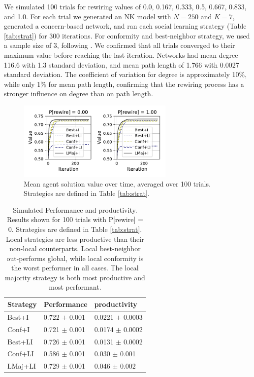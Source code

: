 We simulated 100 trials for rewiring values of 0.0, 0.167, 0.333, 0.5, 0.667, 0.833, and 1.0.
For each trial we generated an NK model with $N=250$ and $K=7$,
generated a concern-based network, and ran each social learning strategy
(Table \ref{tab:strat}) for 300 iterations.
For conformity and best-neighbor strategy, we used a sample size of 3, following
\cite{barkoczi_social_2016}.
We confirmed that all trials converged to their maximum value before reaching
the last iteration.
Networks had mean degree 116.6 with 1.3 standard deviation,
and mean path length of 1.766 with 0.0027 standard deviation.
The coefficient of variation for degree is approximately 10\%,
while only 1\% for mean path length, confirming that the rewiring process has a stronger influence
on degree than on path length.

\begin{figure}[t!]
\centering
\includegraphics[width=3in,height=1.5in]{fig/WPProdPerf/fig-val-iter.pdf}
\caption{
Mean agent solution value over time, averaged over 100 trials.
Strategies are defined in Table \ref{tab:strat}.
\label{fig:val-iter}
}
\end{figure}

\begin{table}
\small
\centering
\begin{tabular}{lll}
Strategy & Performance & productivity\\
\hline
Best+I  & 0.722 $\pm$ 0.001 & 0.0221 $\pm$ 0.0003 \\
Conf+I  & 0.721 $\pm$ 0.001 & 0.0174 $\pm$ 0.0002 \\
Best+LI & 0.726 $\pm$ 0.001 & 0.0131 $\pm$ 0.0002 \\
Conf+LI & 0.586 $\pm$ 0.001 & 0.030 $\pm$ 0.001 \\
LMaj+LI & 0.729 $\pm$ 0.001 & 0.046 $\pm$ 0.002 \\
\hline
\end{tabular}
\caption{
Simulated Performance and productivity.
Results shown for 100 trials with P[rewire] = 0.
Strategies are defined in Table \ref{tab:strat}.
Local strategies are less productive than their non-local counterparts.
Local best-neighbor out-performs global,
while local conformity is the worst performer in all cases.
The local majority strategy is both most productive and most performant.
\label{tab:sim-eff-perf}
}
\end{table}

